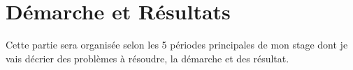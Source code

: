 \chapter{Démarche et Résultats}
Cette partie sera organisée selon les 5 périodes principales de mon stage dont je vais décrier des problèmes à résoudre, la démarche et des résultat. 





